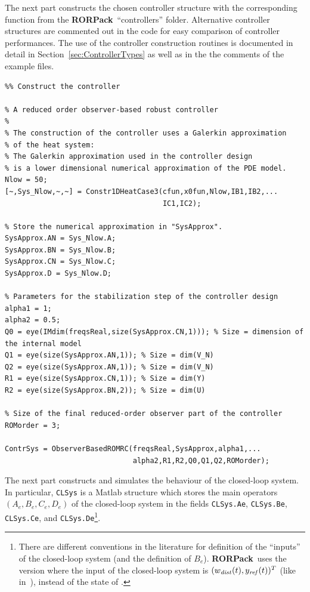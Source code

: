 \documentclass[11pt, a4paper]{amsart}
\theoremstyle{definition}
\numberwithin{equation}{section}
\newcommand{\yref}{y_{\mbox{\scriptsize\textit{ref}}}}
\newcommand{\wdist}{w_{\mbox{\scriptsize\textit{dist}}}}
\newcommand{\RORname}{\textbf{RORPack}}
\begin{document}
The next part constructs the chosen controller structure with the corresponding function from the \RORname\ ``controllers'' folder. Alternative controller structures are commented out in the code for easy comparison of controller performances.
The use of the controller construction routines is documented in detail in Section~\ref{sec:ControllerTypes} as well as in the the comments of the example files.

\begin{lstlisting} 
%% Construct the controller

% A reduced order observer-based robust controller
%
% The construction of the controller uses a Galerkin approximation
% of the heat system:
% The Galerkin approximation used in the controller design 
% is a lower dimensional numerical approximation of the PDE model.
Nlow = 50;
[~,Sys_Nlow,~,~] = Constr1DHeatCase3(cfun,x0fun,Nlow,IB1,IB2,...  
                                     IC1,IC2);

% Store the numerical approximation in "SysApprox".
SysApprox.AN = Sys_Nlow.A;
SysApprox.BN = Sys_Nlow.B;
SysApprox.CN = Sys_Nlow.C;
SysApprox.D = Sys_Nlow.D;

% Parameters for the stabilization step of the controller design
alpha1 = 1;
alpha2 = 0.5;
Q0 = eye(IMdim(freqsReal,size(SysApprox.CN,1))); % Size = dimension of the internal model
Q1 = eye(size(SysApprox.AN,1)); % Size = dim(V_N)
Q2 = eye(size(SysApprox.AN,1)); % Size = dim(V_N)
R1 = eye(size(SysApprox.CN,1)); % Size = dim(Y)
R2 = eye(size(SysApprox.BN,2)); % Size = dim(U)

% Size of the final reduced-order observer part of the controller
ROMorder = 3;

ContrSys = ObserverBasedROMRC(freqsReal,SysApprox,alpha1,...
                              alpha2,R1,R2,Q0,Q1,Q2,ROMorder);
\end{lstlisting}

The next part constructs and simulates the behaviour of the closed-loop system. In particular, \texttt{CLSys} is a Matlab structure which stores the main operators $(A_e,B_e,C_e,D_e)$ of the closed-loop system in the fields \texttt{CLSys.Ae}, \texttt{CLSys.Be},   \texttt{CLSys.Ce}, and \texttt{CLSys.De}\footnote{There are different conventions in the literature for definition of the ``inputs'' of the closed-loop system (and the definition of $B_e$). \RORname\ uses the version where the input of the closed-loop system is $(\wdist(t),\yref(t))^T$ (like in~\cite{PauPha20}), instead of the state of .}.
\end{document}
